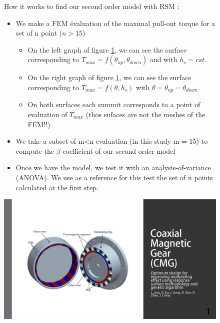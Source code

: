 \begin{figure}[H]
    \begin{minipage}{.45\linewidth}
    How it works to find our second order model with RSM : 
    \begin{itemize}
        \item We make a FEM évaluation of the maximal pull-out torque for a set of n point ($n>15$)
            \begin{itemize}
                \item On the left graph of figure \ref{fig:58_th slide}, we can see the surface corresponding to $T_{max} = f(\theta_{up},\theta_{down})$ and with $h_s = cst$.
                \item On the right graph of figure \ref{fig:58_th slide}, we can see the surface corresponding to $T_{max} = f(\theta, h_s)$ with $\theta  = \theta_{up} = \theta_{down}$.
                \item On both surfaces each summit corresponds to a point of evaluation of $T_{max}$ (thos sufaces are not the meshes of the FEM!!)
            \end{itemize}
        \item We take a subset of m<n evaluation (in this study m = 15) to compute the $\beta$ coefficient of our second order model
        \item Once we have the model, we test it with an analysis-of-variance (ANOVA). We use as a reference for this test the set of n points calculated at the first step.
    \end{itemize}
    \end{minipage}
    \hfill%
    \begin{minipage}[c]{.53\linewidth}
        \centering
        \includegraphics[page={58},width=\textwidth]{LELEC2311.allow.pdf}
        \caption{}
        \label{fig:58_th slide}
    \end{minipage}
\end{figure}

